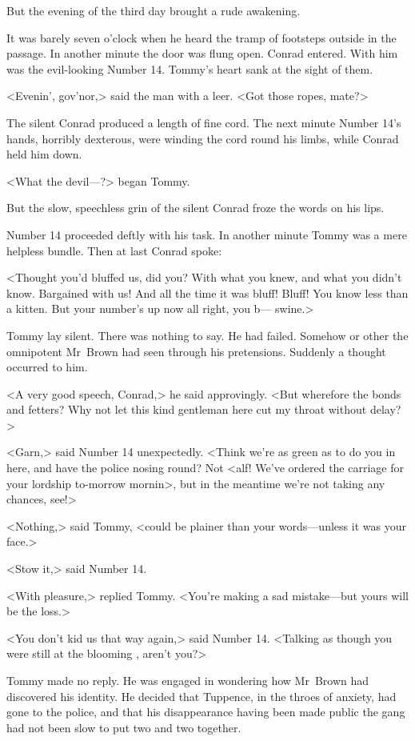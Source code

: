 But the evening of the third day brought a rude awakening.

It was barely seven o'clock when he heard the tramp of footsteps outside in the passage. In another minute the door was flung open. Conrad entered. With him was the evil-looking Number 14. Tommy's heart sank at the sight of them.

<Evenin', gov'nor,> said the man with a leer. <Got those ropes, mate?>

The silent Conrad produced a length of fine cord. The next minute Number 14's hands, horribly dexterous, were winding the cord round his limbs, while Conrad held him down.

<What the devil—?> began Tommy.

But the slow, speechless grin of the silent Conrad froze the words on his lips.

Number 14 proceeded deftly with his task. In another minute Tommy was a mere helpless bundle. Then at last Conrad spoke:

<Thought you'd bluffed us, did you? With what you knew, and what you didn't know. Bargained with us! And all the time it was bluff! Bluff! You know less than a kitten. But your number's up now all right, you b— swine.>

Tommy lay silent. There was nothing to say. He had failed. Somehow or other the omnipotent Mr~Brown had seen through his pretensions. Suddenly a thought occurred to him.

<A very good speech, Conrad,> he said approvingly. <But wherefore the bonds and fetters? Why not let this kind gentleman here cut my throat without delay?>

<Garn,> said Number 14 unexpectedly. <Think we're as green as to do you in here, and have the police nosing round? Not <alf! We've ordered the carriage for your lordship to-morrow mornin>, but in the meantime we're not taking any chances, see!>

<Nothing,> said Tommy, <could be plainer than your words—unless it was your face.>

<Stow it,> said Number 14.

<With pleasure,> replied Tommy. <You're making a sad mistake—but yours will be the loss.>

<You don't kid us that way again,> said Number 14. <Talking as though you were still at the blooming , aren't you?>

Tommy made no reply. He was engaged in wondering how Mr~Brown had discovered his identity. He decided that Tuppence, in the throes of anxiety, had gone to the police, and that his disappearance having been made public the gang had not been slow to put two and two together.

